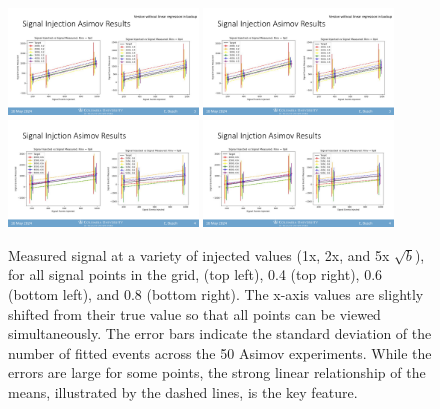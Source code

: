 \begin{figure}[!htbp]
\centering
   \includegraphics[width=0.45\textwidth]{figures/stats/siginj_asimov_02}
   \includegraphics[width=0.45\textwidth]{figures/stats/siginj_asimov_04}
   \includegraphics[width=0.45\textwidth]{figures/stats/siginj_asimov_06}
   \includegraphics[width=0.45\textwidth]{figures/stats/siginj_asimov_08}
   \caption{Measured signal at a variety of injected values (1x, 2x, and 5x $\sqrt{b}$), for all signal points in the grid,  (top left), 0.4 (top right), 0.6 (bottom left), and 0.8 (bottom right). The x-axis values are slightly shifted from their true value so that all points can be viewed simultaneously. The error bars indicate the standard deviation of the number of fitted events across the 50 Asimov experiments. While the errors are large for some points, the strong linear relationship of the means, illustrated by the dashed lines, is the key feature.
    \label{fig:siginj_asimov}}
\end{figure}

